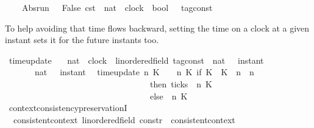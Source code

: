 \begin{isabellebody}
\ \ {\isacartoucheopen}{\isasymrho}\isactrlsub {\isasymodot}\ {\isasymequiv}\ Abs{\isacharunderscore}run\ {\isacharparenleft}{\isacharparenleft}{\isasymlambda}{\isacharunderscore}\ {\isacharunderscore}{\isachardot}\ {\isacharparenleft}False{\isacharcomma}\ {\isasymtau}\isactrlsub c\isactrlsub s\isactrlsub t\ {}{\isacharparenright}{\isacharparenright}\ {\isacharcolon}{\isacharcolon}nat\ {\isasymRightarrow}\ clock\ {\isasymRightarrow}\ {\isacharparenleft}bool\ {\isasymtimes}\ {\isacharprime}{\isasymtau}\ tag{\isacharunderscore}const{\isacharparenright}{\isacharparenright}{\isacartoucheclose}%
\begin{isamarkuptext}%
To help avoiding that time flows backward, setting the time on a clock at a given 
  instant sets it for the future instants too.%
\end{isamarkuptext}\isamarkuptrue%
\isamarkupfalse%
\ time{\isacharunderscore}update\isanewline
\ \ {\isacharcolon}{\isacharcolon}\ {\isacartoucheopen}nat\ {\isasymRightarrow}\ clock\ {\isasymRightarrow}\ {\isacharparenleft}{\isacharprime}{\isasymtau}{\isacharcolon}{\isacharcolon}linordered{\isacharunderscore}field{\isacharparenright}\ tag{\isacharunderscore}const\ {\isasymRightarrow}\ {\isacharparenleft}nat\ {\isasymRightarrow}\ {\isacharprime}{\isasymtau}\ instant{\isacharparenright}\isanewline
\ \ \ \ \ \ {\isasymRightarrow}\ {\isacharparenleft}nat\ {\isasymRightarrow}\ {\isacharprime}{\isasymtau}\ instant{\isacharparenright}{\isacartoucheclose}\isanewline
{}\isanewline
\ \ {\isacartoucheopen}time{\isacharunderscore}update\ n\ K\ {\isasymtau}\ {\isasymrho}\ {\isacharequal}\ {\isacharparenleft}{\isasymlambda}n{\isacharprime}\ K{\isacharprime}{\isachardot}\ if\ K\ {\isacharequal}\ K{\isacharprime}\ {\isasymand}\ n\ {\isasymle}\ n{\isacharprime}\isanewline
\ \ \ \ \ \ \ \ \ \ \ \ \ \ \ \ \ \ \ \ \ \ \ \ \ \ \ \ \ \ \ \ \ \ then\ {\isacharparenleft}ticks\ {\isacharparenleft}{\isasymrho}\ n\ K{\isacharparenright}{\isacharcomma}\ {\isasymtau}{\isacharparenright}\isanewline
\ \ \ \ \ \ \ \ \ \ \ \ \ \ \ \ \ \ \ \ \ \ \ \ \ \ \ \ \ \ \ \ \ \ else\ {\isasymrho}\ n{\isacharprime}\ K{\isacharprime}{\isacharparenright}{\isacartoucheclose}%
\isadelimdocument
%
\endisadelimdocument
%
\isatagdocument
%
\isamarkuptrue%
%
\endisatagdocument
{\isafolddocument}%
%
\isadelimdocument
%
\endisadelimdocument
{}\isamarkupfalse%
\ context{\isacharunderscore}consistency{\isacharunderscore}preservationI{\isacharcolon}\isanewline
\ \ {\isacartoucheopen}consistent{\isacharunderscore}context\ {\isacharparenleft}{\isacharparenleft}{\isasymgamma}{\isacharcolon}{\isacharcolon}{\isacharparenleft}{\isacharprime}{\isasymtau}{\isacharcolon}{\isacharcolon}linordered{\isacharunderscore}field{\isacharparenright}\ constr{\isacharparenright}{\isacharhash}{\isasymGamma}{\isacharparenright}\ {\isasymLongrightarrow}\ consistent{\isacharunderscore}context\ {\isasymGamma}{\isacartoucheclose}\isanewline

\end{isabellebody}
